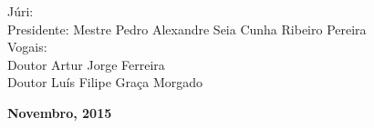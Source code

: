 \begin{titlepage}
\begin{center}
		\begin{tabbing}
		   \fontsize{12pt}{10pt}\selectfont
		   Júri: \\
		   \fontsize{11pt}{10pt}\selectfont
		   \hspace{1.1cm}Presidente: Mestre Pedro Alexandre Seia Cunha Ribeiro Pereira \\
		   \fontsize{11pt}{10pt}\selectfont
		   \hspace{1.1cm}Vogais: \\
		   \fontsize{11pt}{10pt}\selectfont
		   \hspace{2.2cm}Doutor Artur Jorge Ferreira \\
		   \fontsize{11pt}{10pt}\selectfont
		   \hspace{2.2cm}Doutor Luís Filipe Graça Morgado\\
		\end{tabbing}
		
		\fontsize{10pt}{10pt}\selectfont
		\textbf{Novembro, 2015}
	\end{center}


	
\end{titlepage}
